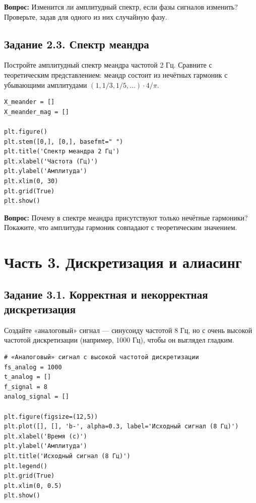 \documentclass[12pt,a4paper,openany]{book}
\begin{document}
\textbf{Вопрос:} Изменится ли амплитудный спектр, если фазы сигналов изменить? Проверьте, задав для одного из них случайную фазу.

\subsection*{Задание 2.3. Спектр меандра}

Постройте амплитудный спектр меандра частотой 2 Гц. Сравните с теоретическим представлением: меандр состоит из нечётных гармоник с убывающими амплитудами \((1, 1/3, 1/5,\dots)\cdot 4/\pi\).

\begin{Verbatim}[fontsize=\small, breaklines, breakanywhere, frame=single, framesep=2mm]
X_meander = []
X_meander_mag = []

plt.figure()
plt.stem([0,], [0,], basefmt=" ")
plt.title('Спектр меандра 2 Гц')
plt.xlabel('Частота (Гц)')
plt.ylabel('Амплитуда')
plt.xlim(0, 30)
plt.grid(True)
plt.show()
\end{Verbatim}

\textbf{Вопрос:} Почему в спектре меандра присутствуют только нечётные гармоники? Покажите, что амплитуды гармоник совпадают с теоретическим значением.

\section*{Часть 3. Дискретизация и алиасинг}

\subsection*{Задание 3.1. Корректная и некорректная дискретизация}

Создайте «аналоговый» сигнал --- синусоиду частотой 8 Гц, но с очень высокой частотой дискретизации (например, 1000 Гц), чтобы он выглядел гладким.

\begin{Verbatim}[fontsize=\small, breaklines, breakanywhere, frame=single, framesep=2mm]
# «Аналоговый» сигнал с высокой частотой дискретизации
fs_analog = 1000
t_analog = []
f_signal = 8
analog_signal = []

plt.figure(figsize=(12,5))
plt.plot([], [], 'b-', alpha=0.3, label='Исходный сигнал (8 Гц)')
plt.xlabel('Время (с)')
plt.ylabel('Амплитуда')
plt.title('Исходный сигнал (8 Гц)')
plt.legend()
plt.grid(True)
plt.xlim(0, 0.5)
plt.show()
\end{Verbatim}
\end{document}

